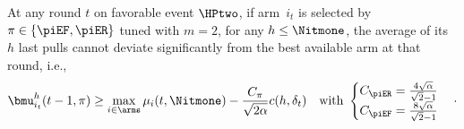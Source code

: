 \begin{lemma}
\label{lem:core-eff}
At any round $t$ on favorable event $\HPtwo$, if arm~$i_{t}$ is selected by $\pi \in \left\{\piEF, \piER\right\}$ tuned with $m=2$, for any $h \leq \Nitmone$,  the average of its $h$ last pulls cannot deviate significantly from the best available arm at that round, i.e.,
\begin{equation*}
\bmu^{h}_{i_t}(t-1,\pi) \geq \max_{i \in \arms} \mu_{i}(t,\Nitmone)- \frac{C_\pi}{\sqrt{2\alpha}} c(h, \delta_t) \quad \text{with } 
\begin{cases}
C_{\piER} = \frac{4\sqrt{\alpha}}{\sqrt{2}-1}\\
C_{\piEF} = \frac{8\sqrt{\alpha}}{\sqrt{2}-1}
\end{cases}\cdot
\end{equation*}
\end{lemma}

